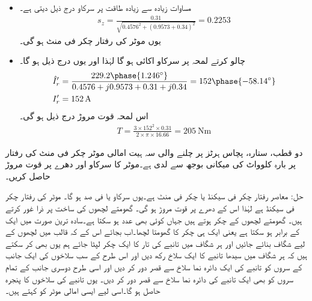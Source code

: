 \begin{itemize}
مساوات   اور   کی مدد سے طاقت اور قوت مروڑ حاصل کرتے ہیں۔
\begin{align*}
p_{\text{میکانی}}&=\frac{3\times 21.1^2\times 0.31}{0.03} \times (1-0.03)=\SI{13387.46}{\watt}\\
T&=\frac{13387.46}{(1-0.03) \times 2\times \pi \times 16.66}=\SI{131.83}{\newton \meter}
\end{align*}
%
\item
مساوات  زیادہ سے زیادہ طاقت پر سرکاو درج ذیل دیتی ہے۔
\begin{align*}
s_z=\frac{0.31}{\sqrt{0.4576^2+(0.9573+0.34)^2}}=0.2253
\end{align*}
یوں موٹر کی رفتار  چکر فی منٹ  ہو گی۔
\item
چالو کرتے لمحہ پر سرکاو اکائی ہو گا لہٰذا  اور یوں درج ذیل ہو گا۔
\begin{align*}
\hat{I}_r'&=\frac{229.2 \phase{1.246^{\circ}}}{0.4576+j 0.9573+0.31+j 0.34}=152\phase{-58.14^{\circ}}\\
I_r'&=\SI{152}{\ampere}
\end{align*}
اس لمحہ قوت مروڑ درج ذیل ہو گی۔
\begin{align*}
T=\frac{3 \times 152^2 \times 0.31}{2 \times \pi \times 16.66}=\SI{205}{\newton \meter}
\end{align*}
\end{itemize}
%
دو قطب، ستارہ،  پچاس ہرٹز پر چلنے والی سہ ہیت امالی موٹر   چکر فی منٹ کی رفتار پر بارہ کلوواٹ کی میکانی بوجھ سے لدی ہے۔موٹر کا سرکاو اور دھرے پر قوت مروڑ  حاصل کریں۔

حل:\quad
معاصر رفتار  چکر فی سیکنڈ یا  چکر فی منٹ ہے۔یوں سرکاو   یا  فی صد ہو گا۔ موٹر کی رفتار   چکر فی سیکنڈ ہے لہٰذا اس کے  دھرے پر قوت مروڑ   ہو گی۔
%
گھومتے لچھوں کی ساخت پر ذرا غور کرتے ہیں۔ گھومتے لچھوں کے   چکر ہوتے ہیں جہاں  کوئی بھی عدد ہو سکتا ہے۔سادہ ترین صورت میں   ایک کے برابر ہو سکتا ہے یعنی ایک ہی چکر کا گھومتا لچھا۔اب بجائے اس کے کہ قالب میں لچھوں کے لیے شگاف بنائے جائیں اور ہر شگاف میں تانبے کی تار کا ایک چکر لپٹا جائے ہم یوں بھی کر سکتے ہیں کہ ہر شگاف میں سیدھا تانبے کا ایک سلاخ رکھ دیں اور اس طرح کے سب سلاخوں کی ایک جانب کے سروں کو تانبے کی ایک دائرہ نما سلاخ سے قصر دور کر دیں اور اسی طرح دوسری جانب کے تمام سروں کو بھی ایک تانبے کی دائرہ نما سلاخ سے قصر  دور کر دیں۔ یوں تانبے کی سلاخوں کا پنجرہ حاصل ہو گا۔اسی لیے ایسی امالی موٹر کو  کہتے ہیں۔

